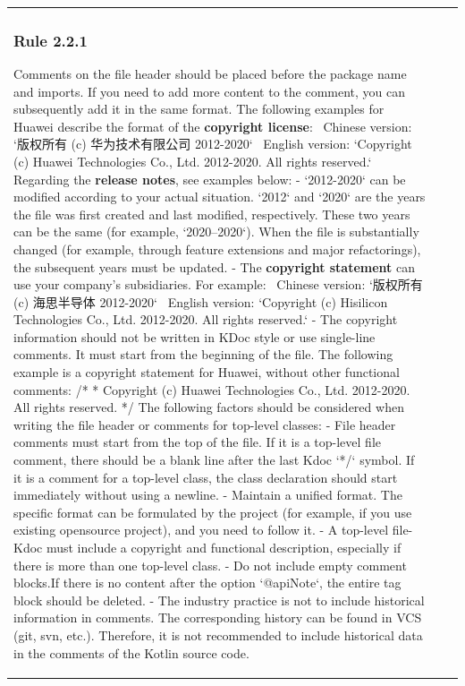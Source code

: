 \begin{center}
\begin{tabular}{ |p{}|p{}|p{}| }
\subsubsection*{\textbf{Rule 2.2.1}}
Comments on the file header should be placed before the package name and imports. If you need to add more content to the comment, you can subsequently add it in the same format.
The following examples for Huawei describe the format of the \textbf{copyright license}: \
Chinese version: `版权所有 (c) 华为技术有限公司 2012-2020` \
English version: `Copyright (c) Huawei Technologies Co., Ltd. 2012-2020. All rights reserved.`
Regarding the \textbf{release notes}, see examples below:
- `2012-2020` can be modified according to your actual situation. `2012` and `2020` are the years the file was first created and last modified, respectively.
These two years can be the same (for example, `2020–2020`). When the file is substantially changed (for example, through feature extensions and major refactorings), the subsequent years must be updated.
- The \textbf{copyright statement} can use your company's subsidiaries. For example: \
Chinese version: `版权所有 (c) 海思半导体 2012-2020` \
English version: `Copyright (c) Hisilicon Technologies Co., Ltd. 2012-2020. All rights reserved.`
- The copyright information should not be written in KDoc style or use single-line comments. It must start from the beginning of the file.
The following example is a copyright statement for Huawei, without other functional comments:
/*
 * Copyright (c) Huawei Technologies Co., Ltd. 2012-2020. All rights reserved.
 */
The following factors should be considered when writing the file header or comments for top-level classes:
- File header comments must start from the top of the file. If it is a top-level file comment, there should be a blank line after the last Kdoc `*/` symbol. If it is a comment for a top-level class, the class declaration should start immediately without using a newline.
- Maintain a unified format. The specific format can be formulated by the project (for example, if you use existing opensource project), and you need to follow it.
- A top-level file-Kdoc must include a copyright and functional description, especially if there is more than one top-level class.
- Do not include empty comment blocks.If there is no content after the option `@apiNote`, the entire tag block should be deleted.
- The industry practice is not to include historical information in comments. The corresponding history can be found in VCS (git, svn, etc.). Therefore, it is not recommended to include historical data in the comments of the Kotlin source code.

\end{tabular}
\end{center}
